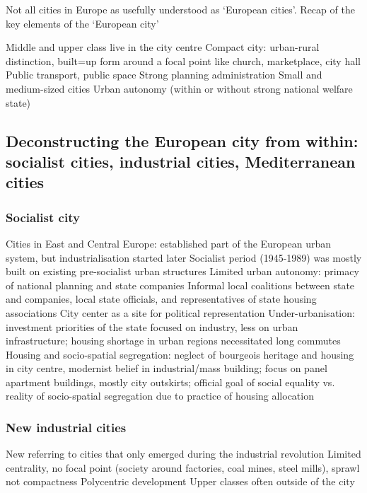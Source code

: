 \documentclass{article}
\begin{document}
Not all cities in Europe as usefully understood as `European cities'. Recap of the key elements of the `European city'

\begin{outline}
	\1 Middle and upper class live in the city centre 
	\1 Compact city: urban-rural distinction, built=up form around a focal point like church, marketplace, city hall
	\1 Public transport, public space
	\1 Strong planning administration
	\1 Small and medium-sized cities
	\1 Urban autonomy (within or without strong national welfare state)
\end{outline}

\subsection{Deconstructing the European city from within: socialist cities, industrial cities, Mediterranean cities}

\subsubsection{Socialist city}

\begin{outline}
	\1  Cities in East and Central Europe: established part of the European urban system, but industrialisation started later
	\1 Socialist period (1945-1989) was mostly built on existing pre-socialist urban structures
	\1 Limited urban autonomy: primacy of national planning and state companies
	\1 Informal local coalitions between state and companies, local state officials, and representatives of state housing associations
	\1 City center as a site for political representation
	\1 Under-urbanisation: investment priorities of the state focused on industry, less on urban infrastructure; housing shortage in urban regions necessitated long commutes
	\1 Housing and socio-spatial segregation: neglect of bourgeois heritage and housing in city centre, modernist belief in industrial/mass building; focus on panel apartment buildings, mostly city outskirts; official goal of social equality vs. reality of socio-spatial segregation due to practice of housing allocation
\end{outline}

\subsubsection{New industrial cities}

\begin{outline}
	\1 New referring to cities that only emerged during the industrial revolution
		\2 Limited centrality, no focal point (society around factories, coal mines, steel mills), sprawl not compactness
		\2 Polycentric development
		\2 Upper classes often outside of the city
	\1
\end{outline}
\end{document}
